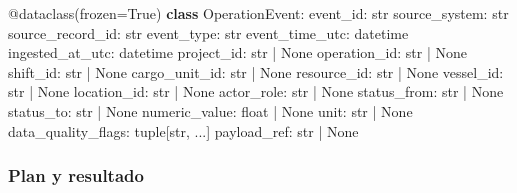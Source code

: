 \documentclass[
  spanish,
  10pt,
  a4paper,
]{article}
\newenvironment{Shaded}{}{}
\newcommand{\AttributeTok}[1]{\textcolor[rgb]{0.49,0.56,0.16}{#1}}
\newcommand{\BuiltInTok}[1]{\textcolor[rgb]{0.00,0.50,0.00}{#1}}
\newcommand{\KeywordTok}[1]{\textcolor[rgb]{0.00,0.44,0.13}{\textbf{#1}}}
\newcommand{\NormalTok}[1]{#1}
\newcommand{\OperatorTok}[1]{\textcolor[rgb]{0.40,0.40,0.40}{#1}}
\newcommand{\VariableTok}[1]{\textcolor[rgb]{0.10,0.09,0.49}{#1}}
\begin{document}
\begin{Shaded}
\begin{Highlighting}[]
\AttributeTok{@dataclass}\NormalTok{(frozen}\OperatorTok{=}\VariableTok{True}\NormalTok{)}
\KeywordTok{class}\NormalTok{ OperationEvent:}
\NormalTok{    event\_id: }\BuiltInTok{str}
\NormalTok{    source\_system: }\BuiltInTok{str}
\NormalTok{    source\_record\_id: }\BuiltInTok{str}
\NormalTok{    event\_type: }\BuiltInTok{str}
\NormalTok{    event\_time\_utc: datetime}
\NormalTok{    ingested\_at\_utc: datetime}
\NormalTok{    project\_id: }\BuiltInTok{str} \OperatorTok{|} \VariableTok{None}
\NormalTok{    operation\_id: }\BuiltInTok{str} \OperatorTok{|} \VariableTok{None}
\NormalTok{    shift\_id: }\BuiltInTok{str} \OperatorTok{|} \VariableTok{None}
\NormalTok{    cargo\_unit\_id: }\BuiltInTok{str} \OperatorTok{|} \VariableTok{None}
\NormalTok{    resource\_id: }\BuiltInTok{str} \OperatorTok{|} \VariableTok{None}
\NormalTok{    vessel\_id: }\BuiltInTok{str} \OperatorTok{|} \VariableTok{None}
\NormalTok{    location\_id: }\BuiltInTok{str} \OperatorTok{|} \VariableTok{None}
\NormalTok{    actor\_role: }\BuiltInTok{str} \OperatorTok{|} \VariableTok{None}
\NormalTok{    status\_from: }\BuiltInTok{str} \OperatorTok{|} \VariableTok{None}
\NormalTok{    status\_to: }\BuiltInTok{str} \OperatorTok{|} \VariableTok{None}
\NormalTok{    numeric\_value: }\BuiltInTok{float} \OperatorTok{|} \VariableTok{None}
\NormalTok{    unit: }\BuiltInTok{str} \OperatorTok{|} \VariableTok{None}
\NormalTok{    data\_quality\_flags: }\BuiltInTok{tuple}\NormalTok{[}\BuiltInTok{str}\NormalTok{, ...]}
\NormalTok{    payload\_ref: }\BuiltInTok{str} \OperatorTok{|} \VariableTok{None}
\end{Highlighting}
\end{Shaded}

\subsubsection{Plan y resultado}\label{plan-y-resultado}
\end{document}
